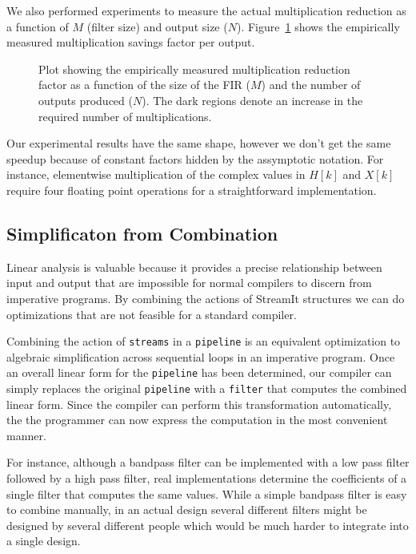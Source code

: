 We also performed experiments to measure the actual multiplication reduction
as a function of $M$ (filter size) and output size ($N$).
Figure~\ref{fig:frequency-win-empirical} shows the empirically measured
multiplication savings factor per output.

\begin{figure}
\center
\epsfxsize=3.2in
\caption{Plot showing the empirically measured multiplication reduction factor as a function of the size of the FIR ($M$) and the number of outputs produced ($N$). The dark regions denote an increase in the required number of multiplications.}
\label{fig:frequency-win-empirical}
\vspace{-12pt}
\end{figure}

Our experimental results have the same shape, however we don't get the same
speedup because of constant factors hidden by the assymptotic notation. For instance,
elementwise multiplication of the complex values in $H[k]$ and $X[k]$ require
four floating point operations for a straightforward implementation.



\subsection{Simplificaton from Combination}
Linear analysis is valuable because it provides a precise relationship between input and output   
that are impossible for normal compilers to discern from imperative programs. By 
combining the actions of StreamIt structures we can do optimizations that are 
not feasible for a standard compiler.

Combining the action of {\tt streams} in a {\tt pipeline} is an equivalent optimization 
to algebraic simplification across sequential loops in an imperative program.
Once an overall linear form for the {\tt pipeline} has been determined, our compiler 
can simply replaces the original {\tt pipeline} with a {\tt filter} that computes the 
combined linear form. Since the compiler can perform this transformation automatically,
the the programmer can now express the computation in the most convenient manner. 

For instance, although a bandpass filter can be implemented with a 
low pass filter followed by a high pass filter, real implementations determine the coefficients 
of a single filter that computes the same values. While a simple bandpass filter is easy to combine
manually, in an actual design several different filters might be designed by 
several different people which would be much harder to integrate into a single design.

